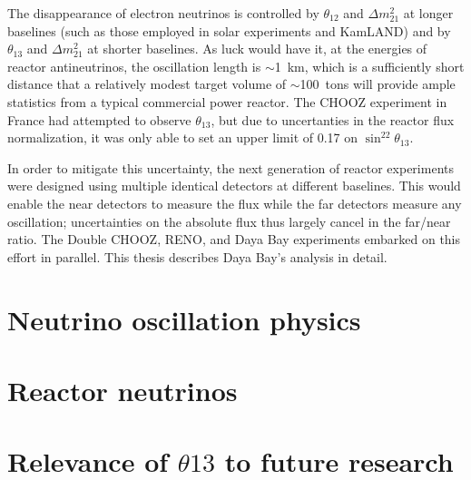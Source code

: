 \documentclass[../thesis.tex]{subfiles}
\begin{document}
The disappearance of electron neutrinos is controlled by $\theta_{12}$ and $\Delta m^2_{21}$ at longer baselines (such as those employed in solar experiments and KamLAND) and by $\theta_{13}$ and $\Delta m^2_{21}$ at shorter baselines. As luck would have it, at the energies of reactor antineutrinos, the oscillation length is $\sim$1~km, which is a sufficiently short distance that a relatively modest target volume of $\sim$100~tons will provide ample statistics from a typical commercial power reactor. The CHOOZ experiment in France had attempted to observe $\theta_{13}$, but due to uncertanties in the reactor flux normalization, it was only able to set an upper limit of 0.17 on $\sin^22\theta_{13}$.

In order to mitigate this uncertainty, the next generation of reactor experiments were designed using multiple identical detectors at different baselines. This would enable the near detectors to measure the flux while the far detectors measure any oscillation; uncertainties on the absolute flux thus largely cancel in the far/near ratio. The Double CHOOZ, RENO, and Daya Bay experiments embarked on this effort in parallel. This thesis describes Daya Bay's analysis in detail.


\section{Neutrino oscillation physics}
\label{sec:oscPhysics}

\section{Reactor neutrinos}
\label{sec:introReactor}

\section{Relevance of $\theta13$ to future research}
\label{sec:futureRelevance}
\end{document}
